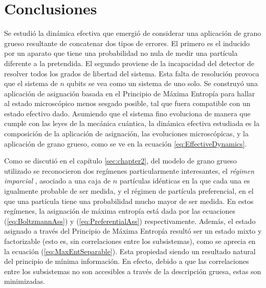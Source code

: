\chapter{Conclusiones}



 

Se estudió la dinámica efectiva que emergió de considerar una aplicación de grano grueso resultante de concatenar dos tipos de errores. El primero es el inducido por un aparato que tiene una probabilidad no nula de medir una partícula diferente a la pretendida. El segundo proviene de la incapacidad del detector de resolver todos los grados de libertad del sistema. Esta falta de resolución provoca que el sistema de $n$ qubits se vea como un sistema de uno solo. Se construyó una aplicación de asignación basada en el Principio de Máxima Entropía para hallar al estado microscópico menos sesgado posible, tal que fuera compatible con un estado efectivo dado. Asumiendo que el sistema fino evoluciona de manera que cumple con las leyes de la mecánica cuántica, la dinámica efectiva estudiada es la composición de la aplicación de asignación, las evoluciones microscópicas, y la aplicación de grano grueso, como se ve en la ecuación \ref{eq:EffectiveDynamics}.


Como se discutió en el capítulo \ref{sec:chapter2}, del modelo de grano grueso utilizado se reconocieron dos regímenes particularmente interesantes, el \textit{régimen imparcial}  \acnote{\checkmark}, asociado a una caja de $n$ partículas idénticas en la que cada una es igualmente probable de ser medida, y el régimen de partícula preferencial, en el que una partícula tiene una probabilidad mucho mayor de ser medida. En estos regímenes, la asignación de máxima entropía está dada por las ecuaciones (\ref{eq:BoltzmannAss}) y (\ref{eq:PreferentialAss}) respectivamente.  Además, el estado asignado a través del Principio de Máxima Entropía resultó ser un estado mixto y factorizable (esto es, sin correlaciones entre los subsistemas), como se aprecia en la ecuación (\ref{eq:MaxEntSeparable}). Esta propiedad siendo un resultado natural del principio de mínima información. En efecto, debido a que las correlaciones entre los subsistemas no son accesibles a través de la descripción gruesa, estas son minimizadas.

